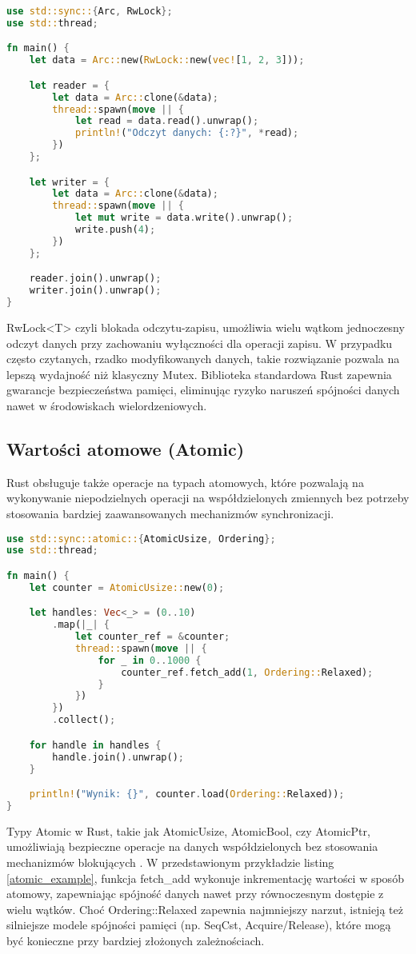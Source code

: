 \begin{lstlisting}[language=Rust, caption=Przykład użycia RwLock, label=rwlock_example]
use std::sync::{Arc, RwLock};
use std::thread;

fn main() {
    let data = Arc::new(RwLock::new(vec![1, 2, 3]));

    let reader = {
        let data = Arc::clone(&data);
        thread::spawn(move || {
            let read = data.read().unwrap();
            println!("Odczyt danych: {:?}", *read);
        })
    };

    let writer = {
        let data = Arc::clone(&data);
        thread::spawn(move || {
            let mut write = data.write().unwrap();
            write.push(4);
        })
    };

    reader.join().unwrap();
    writer.join().unwrap();
}
\end{lstlisting}
RwLock<T>  czyli blokada odczytu-zapisu, umożliwia wielu wątkom jednoczesny odczyt danych przy zachowaniu wyłączności dla operacji zapisu. W przypadku często czytanych, rzadko modyfikowanych danych, takie rozwiązanie pozwala na lepszą wydajność niż klasyczny Mutex. Biblioteka standardowa Rust zapewnia gwarancje bezpieczeństwa pamięci, eliminując ryzyko naruszeń spójności danych nawet w środowiskach wielordzeniowych.  
\subsection{Wartości atomowe (Atomic)}

Rust obsługuje także operacje na typach atomowych, które pozwalają na wykonywanie niepodzielnych operacji na współdzielonych zmiennych bez potrzeby stosowania bardziej zaawansowanych mechanizmów synchronizacji.

\begin{lstlisting}[language=Rust, caption=Przykład użycia Atomic, label=atomic_example]
use std::sync::atomic::{AtomicUsize, Ordering};
use std::thread;

fn main() {
    let counter = AtomicUsize::new(0);

    let handles: Vec<_> = (0..10)
        .map(|_| {
            let counter_ref = &counter;
            thread::spawn(move || {
                for _ in 0..1000 {
                    counter_ref.fetch_add(1, Ordering::Relaxed);
                }
            })
        })
        .collect();

    for handle in handles {
        handle.join().unwrap();
    }

    println!("Wynik: {}", counter.load(Ordering::Relaxed));
}
\end{lstlisting}
Typy Atomic w Rust, takie jak AtomicUsize, AtomicBool, czy AtomicPtr, umożliwiają bezpieczne operacje na danych współdzielonych bez stosowania mechanizmów blokujących . W przedstawionym przykładzie listing \ref{atomic_example}, funkcja fetch\_add wykonuje inkrementację wartości w sposób atomowy, zapewniając spójność danych nawet przy równoczesnym dostępie z wielu wątków. Choć Ordering::Relaxed zapewnia najmniejszy narzut, istnieją też silniejsze modele spójności pamięci (np. SeqCst, Acquire/Release), które mogą być konieczne przy bardziej złożonych zależnościach.

